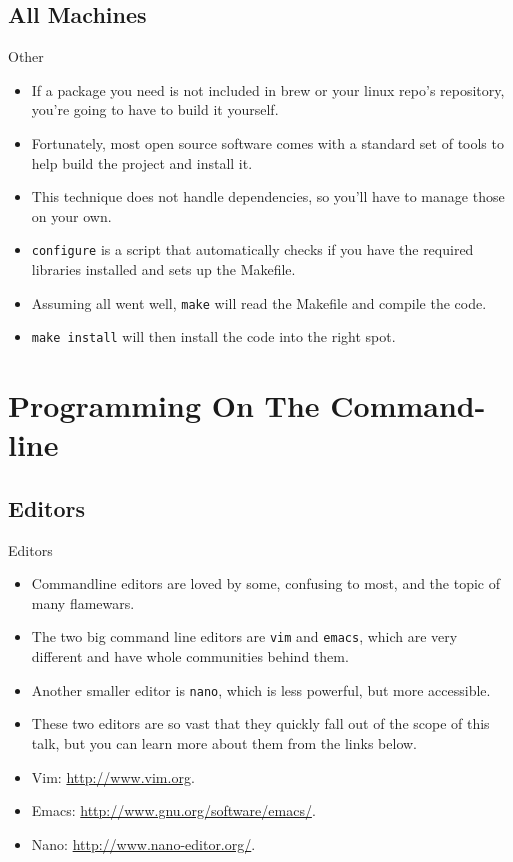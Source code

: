 \documentclass[10pt]{beamer}
\begin{document}
\subsection{All Machines}
\begin{frame}{Other}
\begin{itemize}
\item If a package you need is not included in brew or your linux repo's repository, you're going to have to build it yourself.
\item Fortunately, most open source software comes with a standard set of tools to help build the project and install it.
\item This technique does not handle dependencies, so you'll have to manage those on your own.
\item \texttt{\color{blue}configure} is a script that automatically checks if you have the required libraries installed and sets up the Makefile.
\item Assuming all went well, \texttt{\color{blue}make} will read the Makefile and compile the code.
\item \texttt{\color{blue}make install} will then install the code into the right spot.
\end{itemize}
\end{frame}

\section{Programming On The Command-line}

\subsection{Editors}
\begin{frame}{Editors}
\begin{itemize}
\item Commandline editors are loved by some, confusing to most, and the topic of many flamewars.
\item The two big command line editors are \texttt{\color{blue}vim} and \texttt{\color{blue}emacs}, which are very different and have whole communities behind them.
\item Another smaller editor is \texttt{\color{blue}nano}, which is less powerful, but more accessible.
\item These two editors are so vast that they quickly fall out of the scope of this talk, but you can learn more about them from the links below.
\item Vim: \url{http://www.vim.org}.
\item Emacs: \url{http://www.gnu.org/software/emacs/}.
\item Nano: \url{http://www.nano-editor.org/}.
\end{itemize}
\end{frame}
\end{document}
